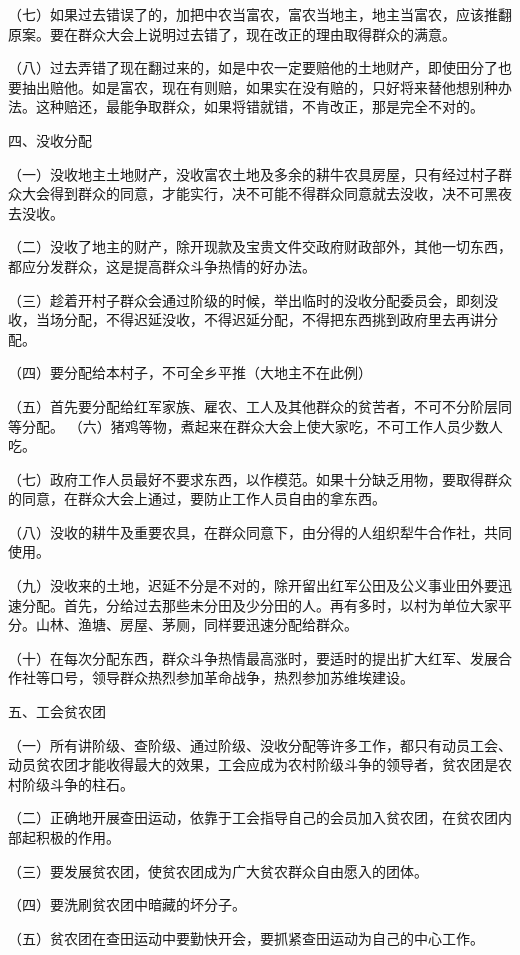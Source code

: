 （七）如果过去错误了的，加把中农当富农，富农当地主，地主当富农，应该推翻原案。要在群众大会上说明过去错了，现在改正的理由取得群众的满意。

（八）过去弄错了现在翻过来的，如是中农一定要赔他的土地财产，即使田分了也要抽出赔他。如是富农，现在有则赔，如果实在没有赔的，只好将来替他想别种办法。这种赔还，最能争取群众，如果将错就错，不肯改正，那是完全不对的。

四、没收分配

（一）没收地主土地财产，没收富农土地及多余的耕牛农具房屋，只有经过村子群众大会得到群众的同意，才能实行，决不可能不得群众同意就去没收，决不可黑夜去没收。

（二）没收了地主的财产，除开现款及宝贵文件交政府财政部外，其他一切东西，都应分发群众，这是提高群众斗争热情的好办法。

（三）趁着开村子群众会通过阶级的时候，举出临时的没收分配委员会，即刻没收，当场分配，不得迟延没收，不得迟延分配，不得把东西挑到政府里去再讲分配。

（四）要分配给本村子，不可全乡平推（大地主不在此例）

（五）首先要分配给红军家族、雇农、工人及其他群众的贫苦者，不可不分阶层同等分配。
（六）猪鸡等物，煮起来在群众大会上使大家吃，不可工作人员少数人吃。

（七）政府工作人员最好不要求东西，以作模范。如果十分缺乏用物，要取得群众的同意，在群众大会上通过，要防止工作人员自由的拿东西。

（八）没收的耕牛及重要农具，在群众同意下，由分得的人组织犁牛合作社，共同使用。

（九）没收来的土地，迟延不分是不对的，除开留出红军公田及公义事业田外要迅速分配。首先，分给过去那些未分田及少分田的人。再有多时，以村为单位大家平分。山林、渔塘、房屋、茅厕，同样要迅速分配给群众。

（十）在每次分配东西，群众斗争热情最高涨时，要适时的提出扩大红军、发展合作社等口号，领导群众热烈参加革命战争，热烈参加苏维埃建设。

五、工会贫农团

（一）所有讲阶级、查阶级、通过阶级、没收分配等许多工作，都只有动员工会、动员贫农团才能收得最大的效果，工会应成为农村阶级斗争的领导者，贫农团是农村阶级斗争的柱石。

（二）正确地开展查田运动，依靠于工会指导自己的会员加入贫农团，在贫农团内部起积极的作用。

（三）要发展贫农团，使贫农团成为广大贫农群众自由愿入的团体。

（四）要洗刷贫农团中暗藏的坏分子。

（五）贫农团在查田运动中要勤快开会，要抓紧查田运动为自己的中心工作。

